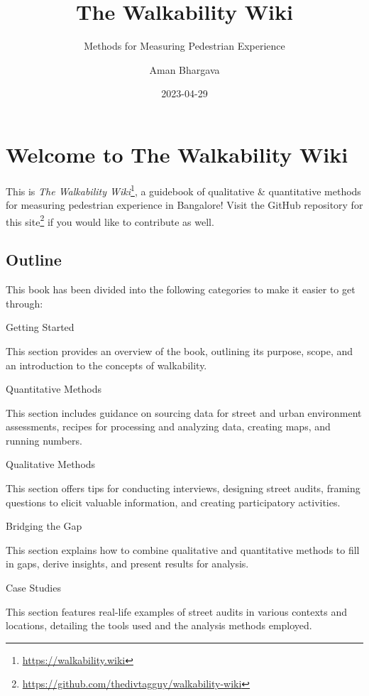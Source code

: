 \documentclass[
]{latex/krantz}
\title{The Walkability Wiki}
\subtitle{Methods for Measuring Pedestrian Experience}
\author{Aman Bhargava}
\date{2023-04-29}
\renewcommand{\href}[2]{#2\footnote{\url{#1}}}
\DeclareRobustCommand{\href}[2]{#2\footnote{\url{#1}}}
\begin{document}
\maketitle

{
\hypersetup{linkcolor=}
\setcounter{tocdepth}{3}
\tableofcontents
}
\hypertarget{welcome-to-the-walkability-wiki}{%
\section*{Welcome to The Walkability Wiki}\label{welcome-to-the-walkability-wiki}}


This is \href{https://walkability.wiki}{\emph{The Walkability Wiki}}, a guidebook of qualitative \& quantitative methods for measuring pedestrian experience in Bangalore! Visit the \href{https://github.com/thedivtagguy/walkability-wiki}{GitHub repository for this site} if you would like to contribute as well.

\hypertarget{outline}{%
\subsection*{Outline}\label{outline}}


This book has been divided into the following categories to make it easier to get through:

Getting Started

This section provides an overview of the book, outlining its purpose, scope, and an introduction to the concepts of walkability.

Quantitative Methods

This section includes guidance on sourcing data for street and urban environment assessments, recipes for processing and analyzing data, creating maps, and running numbers.

Qualitative Methods

This section offers tips for conducting interviews, designing street audits, framing questions to elicit valuable information, and creating participatory activities.

Bridging the Gap

This section explains how to combine qualitative and quantitative methods to fill in gaps, derive insights, and present results for analysis.

Case Studies

This section features real-life examples of street audits in various contexts and locations, detailing the tools used and the analysis methods employed.
\end{document}
